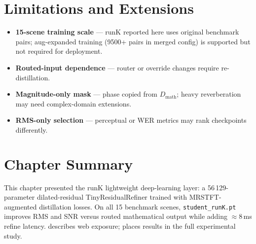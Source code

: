 \section{Limitations and Extensions}
\label{sec:dl_limits}

\begin{itemize}
  \item \textbf{15-scene training scale} --- runK reported here uses original benchmark pairs; aug-expanded training (9500+ pairs in merged config) is supported but not required for deployment.
  \item \textbf{Routed-input dependence} --- router or override changes require re-distillation.
  \item \textbf{Magnitude-only mask} --- phase copied from $D_{\mathrm{math}}$; heavy reverberation may need complex-domain extensions.
  \item \textbf{RMS-only selection} --- perceptual or WER metrics may rank checkpoints differently.
\end{itemize}

\section{Chapter Summary}
\label{sec:dl_summary}

This chapter presented the runK lightweight deep-learning layer: a 56\,129-parameter dilated-residual TinyResidualRefiner trained with MRSTFT-augmented distillation losses. On all 15 benchmark scenes, \texttt{student\_runK.pt} improves RMS and SNR versus routed mathematical output while adding $\approx 8$\,ms refine latency.  describes web exposure;  places results in the full experimental study.
